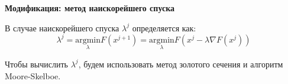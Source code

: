 \textbf{Модификация: метод наискорейшего спуска}

В случае наискорейшего спуска $\lambda^{j}$ определяется как:
$$\lambda^{j}=\underset{\lambda}{\mathrm{argmin}} F\left(x^{j+1}\right) = \underset{\lambda}{\mathrm{argmin}}F\left(x^{j}-\lambda \nabla F\left(x^{j}\right)\right)$$

\begin{remark*}
Чтобы вычислить $\lambda^{j}$, будем использовать метод золотого сечения и алгоритм Moore-Skelboe.
\end{remark*}